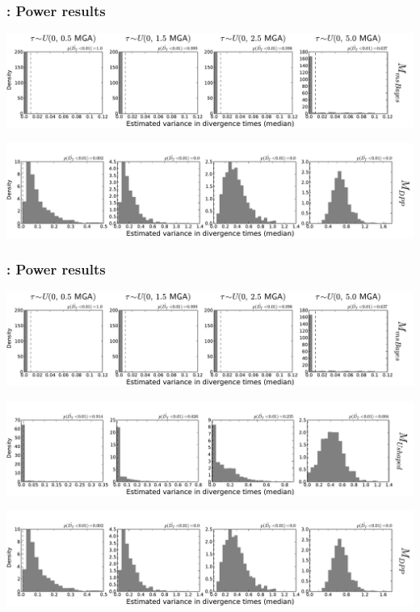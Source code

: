 \begin{frame}[t]
    \frametitle{\dppmsbayes: Power results}
    \vspace{1cm}
        \centerline{
        \includegraphics[width=1.13\textwidth]{images/old_old_power_omega_median.pdf}}
        \vspace{0mm}
        \centerline{
        \includegraphics[width=1.13\textwidth]{images/old_dpp_power_omega_median_headless.pdf}}
\end{frame}

\begin{frame}
    \frametitle{\dppmsbayes: Power results}
        \centerline{
        \includegraphics[width=\textwidth]{images/old_old_power_omega_median.pdf}}
        \vspace{0mm}
        \centerline{
        \includegraphics[width=\textwidth]{images/old_u-shaped_power_omega_median_headless.pdf}}
        \vspace{0mm}
        \centerline{
        \includegraphics[width=\textwidth]{images/old_dpp_power_omega_median_headless.pdf}}
\end{frame}

